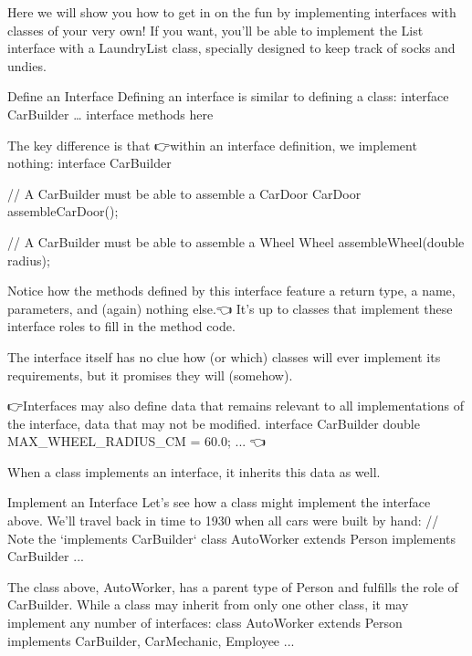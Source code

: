         Here we will show you how to get in on the fun by implementing interfaces with classes of your very own! If you want, you’ll be able to implement the List interface with a LaundryList class, specially designed to keep track of socks and undies.

    Define an Interface
        Defining an interface is similar to defining a class:
            interface CarBuilder {
                … interface methods here
            }

        The key difference is that 👉within an interface definition, we implement nothing:
            interface CarBuilder {
                // A CarBuilder must be able to assemble a CarDoor
                CarDoor assembleCarDoor();
            
                // A CarBuilder must be able to assemble a Wheel
                Wheel assembleWheel(double radius);
            
            }

        Notice how the methods defined by this interface feature a return type, a name, parameters, and (again) nothing else.👈 It’s up to classes that implement these interface roles to fill in the method code.

        The interface itself has no clue how (or which) classes will ever implement its requirements, but it promises they will (somehow).

        👉Interfaces may also define data that remains relevant to all implementations of the interface, data that may not be modified.
            interface CarBuilder {
                double MAX_WHEEL_RADIUS_CM = 60.0;
                ...
            }👈

        When a class implements an interface, it inherits this data as well.

    Implement an Interface
        Let’s see how a class might implement the interface above. We’ll travel back in time to 1930 when all cars were built by hand:
            // Note the `implements CarBuilder`
            class AutoWorker extends Person implements CarBuilder {
                ...
            }

        The class above, AutoWorker, has a parent type of Person and fulfills the role of CarBuilder. While a class may inherit from only one other class, it may implement any number of interfaces:
            class AutoWorker extends Person implements CarBuilder, CarMechanic, Employee {
                ...
            }

